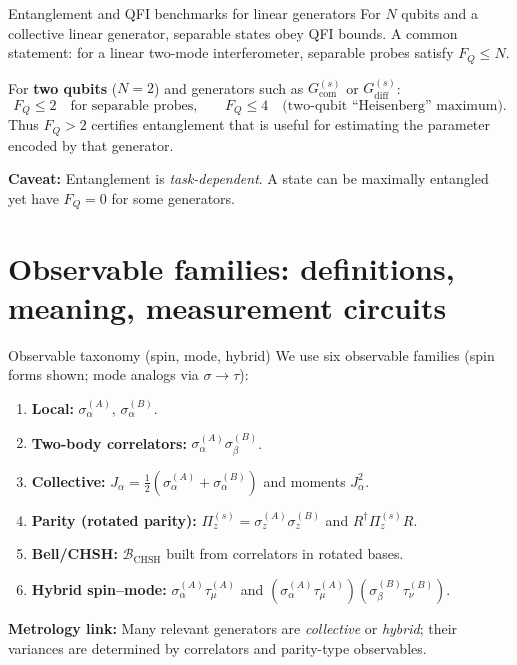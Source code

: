\documentclass[aspectratio=169]{beamer}
\newcommand{\sA}[1]{\sigma_{#1}^{(A)}}
\newcommand{\sB}[1]{\sigma_{#1}^{(B)}}
\newcommand{\tA}[1]{\tau_{#1}^{(A)}}
\newcommand{\tB}[1]{\tau_{#1}^{(B)}}
\newcommand{\Jop}[1]{J_{#1}}
\newcommand{\GcomS}{G_{\mathrm{com}}^{(s)}}
\newcommand{\GdiffS}{G_{\mathrm{diff}}^{(s)}}
\newcommand{\PiZs}{\Pi_{z}^{(s)}}
\begin{document}
\begin{frame}{Entanglement and QFI benchmarks for linear generators}
\small
For $N$ qubits and a collective linear generator, separable states obey QFI bounds.
A common statement: for a linear two-mode interferometer, separable probes satisfy $F_Q \le N$. \citep{Hyllus2012PRA,Pezze2018RMP}

\vspace{0.35em}
For \textbf{two qubits} ($N=2$) and generators such as $\GcomS$ or $\GdiffS$:
\[
F_Q \le 2 \quad \text{for separable probes,}
\qquad
F_Q \le 4 \quad \text{(two-qubit ``Heisenberg'' maximum).}
\]
Thus $F_Q>2$ certifies entanglement that is useful for estimating the parameter encoded by that generator.

\vspace{0.35em}
\textbf{Caveat:}
Entanglement is \emph{task-dependent}. A state can be maximally entangled yet have $F_Q=0$ for some generators.
\end{frame}

\section{Observable families: definitions, meaning, measurement circuits}

\begin{frame}{Observable taxonomy (spin, mode, hybrid)}
\small
We use six observable families (spin forms shown; mode analogs via $\sigma\to\tau$):
\begin{enumerate}
\item \textbf{Local:} $\sA{\alpha}$, $\sB{\alpha}$.
\item \textbf{Two-body correlators:} $\sA{\alpha}\sB{\beta}$.
\item \textbf{Collective:} $\Jop{\alpha}=\frac12(\sA{\alpha}+\sB{\alpha})$ and moments $\Jop{\alpha}^2$.
\item \textbf{Parity (rotated parity):} $\PiZs=\sA{z}\sB{z}$ and $R^\dagger \PiZs R$.
\item \textbf{Bell/CHSH:} $\mathcal{B}_{\mathrm{CHSH}}$ built from correlators in rotated bases. \citep{CHSH1969PRL}
\item \textbf{Hybrid spin--mode:} $\sA{\alpha}\tA{\mu}$ and $(\sA{\alpha}\tA{\mu})(\sB{\beta}\tB{\nu})$.
\end{enumerate}

\vspace{0.35em}
\textbf{Metrology link:}
Many relevant generators are \emph{collective} or \emph{hybrid}; their variances are determined by correlators and parity-type observables. \citep{Pezze2018RMP}
\end{frame}
\end{document}
